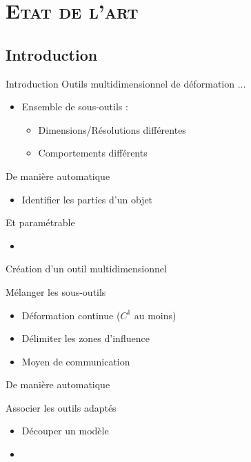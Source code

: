 \documentclass[xcolor=x11names,compress]{beamer}
\renewcommand{\(}{\begin{columns}} \renewcommand{\)}{\end{columns}}
\newcommand{\<}[1]{\begin{column}{#1}} \renewcommand{\>}{\end{column}}
\begin{document}
\section{\scshape Etat de l'art}
\subsection{Introduction}

\begin{frame}{Introduction}
  Outils multidimensionnel de déformation ...
  \begin{itemize}
  \item Ensemble de sous-outils :
    \begin{itemize}
    \item Dimensions/Résolutions différentes
    \item Comportements différents
    \end{itemize}
  \end{itemize}
  De manière automatique
  \begin{itemize}
  \item Identifier les parties d'un objet
  \end{itemize}
  Et paramétrable
  \begin{itemize}
  \item
  \end{itemize}
\end{frame}

\begin{frame}{Création d'un outil multidimensionnel}
  \begin{block}{Mélanger les sous-outils}
    \begin{itemize}
    \item Déformation continue ($C^1$ au moins)
    \item Délimiter les zones d'influence
    \item Moyen de communication
    \end{itemize}
  \end{block}
\end{frame}

\begin{frame}{De manière automatique}
  \begin{block}{Associer les outils adaptés}
    \begin{itemize}
    \item Découper un modèle
\item 
    \end{itemize}
  \end{block}
\end{frame}
\end{document}
